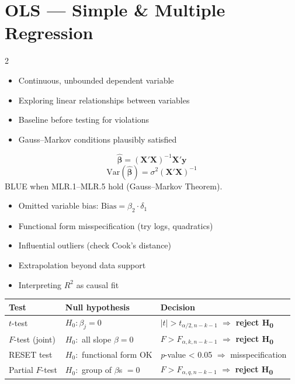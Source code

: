 \documentclass[10pt,a4paper]{article}
\newcommand{\pval}[1]{\textit{p}-value #1 0.05}
\newcommand{\reject}{$\Rightarrow$ \textbf{reject H\textsubscript{0}}}
\begin{document}
\section{OLS --- Simple \& Multiple Regression}

\begin{multicols}{2}

\begin{tcolorbox}[when]
\begin{itemize}
  \item Continuous, unbounded dependent variable
  \item Exploring linear relationships between variables
  \item Baseline before testing for violations
  \item Gauss--Markov conditions plausibly satisfied
\end{itemize}
\end{tcolorbox}

\begin{tcolorbox}[key]
\[
\hat{\boldsymbol{\beta}} = (\mathbf{X}'\mathbf{X})^{-1}\mathbf{X}'\mathbf{y}
\]
\[
\text{Var}(\hat{\boldsymbol{\beta}}) = \sigma^2(\mathbf{X}'\mathbf{X})^{-1}
\]
BLUE when MLR.1--MLR.5 hold (Gauss--Markov Theorem).
\end{tcolorbox}

\columnbreak

\begin{tcolorbox}[watchout]
\begin{itemize}
  \item Omitted variable bias: $\text{Bias} = \beta_2 \cdot \delta_1$
  \item Functional form misspecification (try logs, quadratics)
  \item Influential outliers (check Cook's distance)
  \item Extrapolation beyond data support
  \item Interpreting $R^2$ as causal fit
\end{itemize}
\end{tcolorbox}

\end{multicols}

\begin{tcolorbox}[tests]
\begin{tabularx}{\linewidth}{lXl}
\toprule
\textbf{Test} & \textbf{Null hypothesis} & \textbf{Decision} \\
\midrule
$t$-test & $H_0: \beta_j = 0$ & $|t| > t_{\alpha/2,n-k-1}$ \reject \\
\rowcolor{RowGray}
$F$-test (joint) & $H_0:$ all slope $\beta = 0$ & $F > F_{\alpha,k,n-k-1}$ \reject \\
RESET test & $H_0:$ functional form OK & \pval{<} $\Rightarrow$ misspecification \\
\rowcolor{RowGray}
Partial $F$-test & $H_0:$ group of $\beta$s $= 0$ & $F > F_{\alpha,q,n-k-1}$ \reject \\
\bottomrule
\end{tabularx}
\end{tcolorbox}
\end{document}
